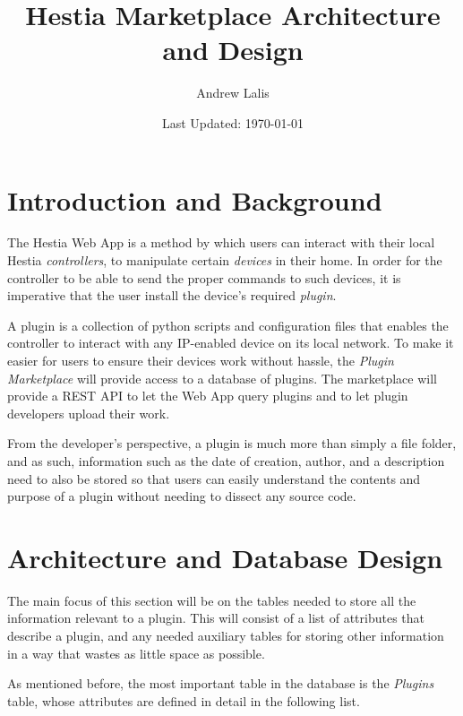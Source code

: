 \documentclass[a4paper, 12pt]{article}
\begin{document}
\title{Hestia Marketplace Architecture and Design}
\author{Andrew Lalis}
\date{Last Updated: \today}
\maketitle

\tableofcontents
\newpage

\section{Introduction and Background}
	The Hestia Web App is a method by which users can interact with their local Hestia \emph{controllers}, to manipulate certain \emph{devices} in their home. In order for the controller to be able to send the proper commands to such devices, it is imperative that the user install the device's required \emph{plugin}.

	A plugin is a collection of python scripts and configuration files that enables the controller to interact with any IP-enabled device on its local network. To make it easier for users to ensure their devices work without hassle, the \emph{Plugin Marketplace} will provide access to a database of plugins. The marketplace will provide a REST API to let the Web App query plugins and to let plugin developers upload their work.

	From the developer's perspective, a plugin is much more than simply a file folder, and as such, information such as the date of creation, author, and a description need to also be stored so that users can easily understand the contents and purpose of a plugin without needing to dissect any source code.

\section{Architecture and Database Design}
	The main focus of this section will be on the tables needed to store all the information relevant to a plugin. This will consist of a list of attributes that describe a plugin, and any needed auxiliary tables for storing other information in a way that wastes as little space as possible.

	As mentioned before, the most important table in the database is the \emph{Plugins} table, whose attributes are defined in detail in the following list.
\end{document}
